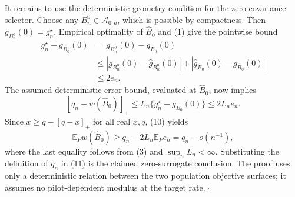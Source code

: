 It remains to use the deterministic geometry condition for the zero-covariance selector.  Choose any \(B_n^0\in\mathcal A_{0,\overline a}\), which is possible by compactness.  Then \(g_{B_n^0}(0)=g_n^\star\).  Empirical optimality of \(\widehat B_0\) and (1) give the pointwise bound
\[
\begin{aligned}
g_n^\star-g_{\widehat B_0}(0)
&=g_{B_n^0}(0)-g_{\widehat B_0}(0)\\
&\le
|g_{B_n^0}(0)-\widehat g_{B_n^0}(0)|
+|\widehat g_{\widehat B_0}(0)-g_{\widehat B_0}(0)|\\
&\le2e_n.
\end{aligned}
\tag{9}
\]
The assumed deterministic error bound, evaluated at \(\widehat B_0\), now implies
\[
[q_n-w(\widehat B_0)]_+
\le L_n\{g_n^\star-g_{\widehat B_0}(0)\}
\le2L_ne_n.
\tag{10}
\]
Since \(x\ge q-[q-x]_+\) for all real \(x,q\), (10) yields
\[
\mathbb E_Pw(\widehat B_0)
\ge q_n-2L_n\mathbb E_Pe_n
=q_n-o(n^{-1}),
\tag{11}
\]
where the last equality follows from (3) and \(\sup_nL_n<\infty\).  Substituting the definition of \(q_n\) in (11) is the claimed zero-surrogate conclusion.  The proof uses only a deterministic relation between the two population objective surfaces; it assumes no pilot-dependent modulus at the target rate. \(\square\)